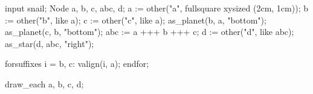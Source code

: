 \startMPpage
input snail;
Node a, b, c, abc, d;
a := other("a", fullsquare xysized (2cm, 1cm));
b := other("b", like a);
c := other("c", like a);
as_planet(b, a, "bottom"); as_planet(c, b, "bottom");
abc := a +++ b +++ c;
d := other("d", like abc);
as_star(d, abc, "right");

forsuffixes i = b, c: valign(i, a); endfor;

draw_each a, b, c, d;
\stopMPpage
